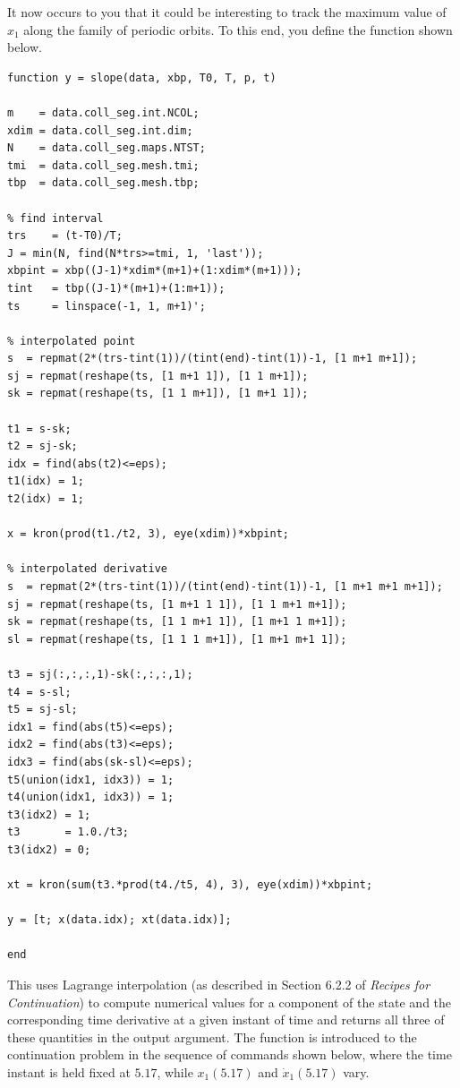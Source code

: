 It now occurs to you that it could be interesting to track the maximum value of $x_1$ along the family of periodic orbits. To this end, you define the function   shown below.
\begin{lstlisting}[language=coco-highlight,frame=shadowbox]
function y = slope(data, xbp, T0, T, p, t)

m    = data.coll_seg.int.NCOL;
xdim = data.coll_seg.int.dim;
N    = data.coll_seg.maps.NTST;
tmi  = data.coll_seg.mesh.tmi;
tbp  = data.coll_seg.mesh.tbp;

% find interval
trs    = (t-T0)/T;
J = min(N, find(N*trs>=tmi, 1, 'last'));
xbpint = xbp((J-1)*xdim*(m+1)+(1:xdim*(m+1)));
tint   = tbp((J-1)*(m+1)+(1:m+1));
ts     = linspace(-1, 1, m+1)';

% interpolated point
s  = repmat(2*(trs-tint(1))/(tint(end)-tint(1))-1, [1 m+1 m+1]);
sj = repmat(reshape(ts, [1 m+1 1]), [1 1 m+1]);
sk = repmat(reshape(ts, [1 1 m+1]), [1 m+1 1]);

t1 = s-sk;
t2 = sj-sk;
idx = find(abs(t2)<=eps);
t1(idx) = 1;
t2(idx) = 1;

x = kron(prod(t1./t2, 3), eye(xdim))*xbpint;

% interpolated derivative
s  = repmat(2*(trs-tint(1))/(tint(end)-tint(1))-1, [1 m+1 m+1 m+1]);
sj = repmat(reshape(ts, [1 m+1 1 1]), [1 1 m+1 m+1]);
sk = repmat(reshape(ts, [1 1 m+1 1]), [1 m+1 1 m+1]);
sl = repmat(reshape(ts, [1 1 1 m+1]), [1 m+1 m+1 1]);

t3 = sj(:,:,:,1)-sk(:,:,:,1);
t4 = s-sl;
t5 = sj-sl;
idx1 = find(abs(t5)<=eps);
idx2 = find(abs(t3)<=eps);
idx3 = find(abs(sk-sl)<=eps);
t5(union(idx1, idx3)) = 1;
t4(union(idx1, idx3)) = 1;
t3(idx2) = 1;
t3       = 1.0./t3;
t3(idx2) = 0;

xt = kron(sum(t3.*prod(t4./t5, 4), 3), eye(xdim))*xbpint;

y = [t; x(data.idx); xt(data.idx)];

end
\end{lstlisting}
This uses Lagrange interpolation (as described in Section 6.2.2 of \textit{Recipes for Continuation}) to compute numerical values for a component of the state and the corresponding time derivative at a given instant of time and returns all three of these quantities in the output argument. The function is introduced to the continuation problem in the sequence of commands shown below, where the time instant is held fixed at $5.17$, while $x_1(5.17)$ and $\dot{x}_1(5.17)$ vary.
